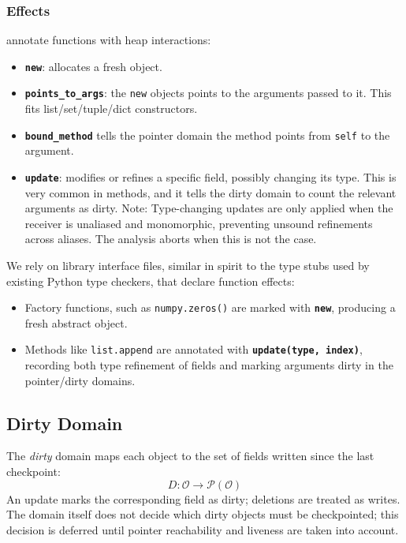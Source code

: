 \subsubsection{Effects} annotate functions with heap interactions:
\begin{itemize}
  \item \textbf{\texttt{new}}: allocates a fresh object.
  \item \textbf{\texttt{points\_to\_args}}: the \texttt{new} objects points to the arguments passed to it. This fits list/set/tuple/dict constructors.
  \item \textbf{\texttt{bound\_method}} tells the pointer domain the method points from \texttt{self} to the argument.
  \item \textbf{\texttt{update}}: modifies or refines a specific field, possibly changing its type. This is very common in methods, and it tells the dirty domain to count the relevant arguments as dirty. Note: Type-changing updates are only applied when the receiver is unaliased and monomorphic, preventing unsound refinements across aliases. The analysis aborts when this is not the case.
\end{itemize}

We rely on library interface files, similar in spirit to the type stubs used by existing Python type checkers, that declare function effects:

\begin{itemize}
  \item Factory functions, such as \texttt{numpy.zeros()} are marked with \textbf{\texttt{new}}, producing a fresh abstract object.
  \item Methods like \texttt{list.append} are annotated with \textbf{\texttt{update(type, index)}}, recording both type refinement of fields and marking arguments dirty in the pointer/dirty domains.
\end{itemize}

\subsection{Dirty Domain}
The \emph{dirty} domain maps each object to the set of fields written since the last checkpoint:
\[D : \mathcal{O} \to \mathcal{P}(\mathcal{O})\]
An update marks the corresponding field as dirty; deletions are treated as writes.
The domain itself does not decide which dirty objects must be checkpointed; this decision is deferred until pointer reachability and liveness are taken into account.

